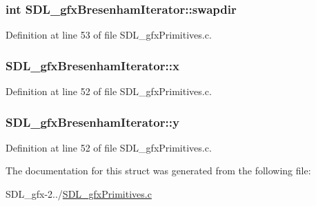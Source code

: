 \subsubsection[{swapdir}]{\setlength{\rightskip}{0pt plus 5cm}int S\+D\+L\+\_\+gfx\+Bresenham\+Iterator\+::swapdir}\label{struct_s_d_l__gfx_bresenham_iterator_ac07c70d86f83b1a63b1ff7e22a1ffc6a}


Definition at line 53 of file S\+D\+L\+\_\+gfx\+Primitives.\+c.

\hypertarget{struct_s_d_l__gfx_bresenham_iterator_ae7d3bf951ddb6d878dd0d9a9d4c95236}{}
\subsubsection[{x}]{ S\+D\+L\+\_\+gfx\+Bresenham\+Iterator\+::x}\label{struct_s_d_l__gfx_bresenham_iterator_ae7d3bf951ddb6d878dd0d9a9d4c95236}


Definition at line 52 of file S\+D\+L\+\_\+gfx\+Primitives.\+c.

\hypertarget{struct_s_d_l__gfx_bresenham_iterator_acaea027dd0f03e970c1a9abdc49e080f}{}
\subsubsection[{y}]{ S\+D\+L\+\_\+gfx\+Bresenham\+Iterator\+::y}\label{struct_s_d_l__gfx_bresenham_iterator_acaea027dd0f03e970c1a9abdc49e080f}


Definition at line 52 of file S\+D\+L\+\_\+gfx\+Primitives.\+c.



The documentation for this struct was generated from the following file\+:\begin{DoxyCompactItemize}
\item 
S\+D\+L\+\_\+gfx-\/2../\hyperlink{_s_d_l__gfx_primitives_8c}{S\+D\+L\+\_\+gfx\+Primitives.\+c}\end{DoxyCompactItemize}
